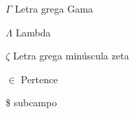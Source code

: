 \begin{simbolos}
    \item[$ \Gamma $] Letra grega Gama
    \item[$ \Lambda $] Lambda
    \item[$ \zeta $] Letra grega minúscula zeta
    \item[$ \in $] Pertence
    \item[\$ ] subcampo
\end{simbolos}